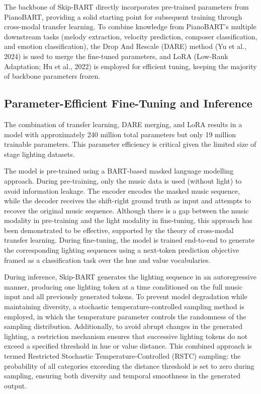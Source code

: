 The backbone of Skip-BART directly incorporates pre-trained parameters from PianoBART, providing a solid starting point for subsequent training through cross-modal transfer learning.\cite{zhao2025automatic}  To combine knowledge from PianoBART's multiple downstream tasks (melody extraction, velocity prediction, composer classification, and emotion classification), the Drop And Rescale (DARE) method (Yu et al., 2024) is used to merge the fine-tuned parameters,\cite{zhao2025automatic}  and LoRA (Low-Rank Adaptation; Hu et al., 2022) is employed for efficient tuning, keeping the majority of backbone parameters frozen.\cite{zhao2025automatic} 

\subsection{Parameter-Efficient Fine-Tuning and Inference}

The combination of transfer learning, DARE merging, and LoRA results in a model with approximately 240 million total parameters but only 19 million trainable parameters.\cite{zhao2025automatic}  This parameter efficiency is critical given the limited size of stage lighting datasets.

The model is pre-trained using a BART-based masked language modelling approach. During pre-training, only the music data is used (without light) to avoid information leakage. The encoder encodes the masked music sequence, while the decoder receives the shift-right ground truth as input and attempts to recover the original music sequence. Although there is a gap between the music modality in pre-training and the light modality in fine-tuning, this approach has been demonstrated to be effective, supported by the theory of cross-modal transfer learning.\cite{zhao2025automatic}  During fine-tuning, the model is trained end-to-end to generate the corresponding lighting sequences using a next-token prediction objective framed as a classification task over the hue and value vocabularies.\cite{zhao2025automatic} 

During inference, Skip-BART generates the lighting sequence in an autoregressive manner, producing one lighting token at a time conditioned on the full music input and all previously generated tokens.\cite{zhao2025automatic}  To prevent model degradation while maintaining diversity, a stochastic temperature-controlled sampling method is employed, in which the temperature parameter controls the randomness of the sampling distribution.\cite{zhao2025automatic}  Additionally, to avoid abrupt changes in the generated lighting, a restriction mechanism ensures that successive lighting tokens do not exceed a specified threshold in hue or value distance.\cite{zhao2025automatic}  This combined approach is termed Restricted Stochastic Temperature-Controlled (RSTC) sampling: the probability of all categories exceeding the distance threshold is set to zero during sampling, ensuring both diversity and temporal smoothness in the generated output.\cite{zhao2025automatic} 

